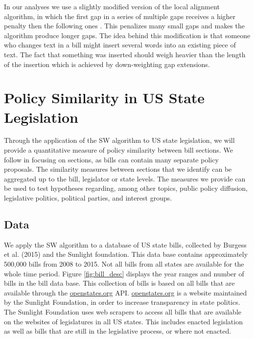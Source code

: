 \documentclass[12pt]{article} %
\begin{document}
In our analyses we use a slightly modified version of the local alignment algorithm, in which the first gap in a series of multiple gaps receives a higher penalty then the following ones \citep[][use the same modification]{wilkerson2015tracing}. This penalizes many small gaps and makes the algorithm produce longer gaps. The idea behind this modification is that someone who changes text in a bill might insert several words into an existing piece of text. The fact that something was inserted should weigh heavier than the length of the insertion which is achieved by down-weighting gap extensions. 




\section{Policy Similarity in US State Legislation}
Through the application of the SW algorithm to US state legislation, we will provide a quantitative measure of policy similarity between bill sections. We follow \citet{wilkerson2015tracing} in focusing on sections, as bills can contain many separate policy proposals. The similarity measures between sections that we identify can be aggregated up to the bill, legislator or state levels. The measures we provide can be used to test hypotheses regarding, among other topics, public policy diffusion, legislative politics, political parties, and interest groups.  

\subsection{Data}
We apply the SW algorithm to a database of US state bills, collected by Burgess et al. (2015) and the Sunlight foundation. This data base contains approximately 500,000 bills from 2008 to 2015. Not all bills from all states are available for the whole time period. Figure \ref{fig:bill_desc} displays the year ranges and number of bills in the bill data base. This collection of bills is based on all bills that are available through the \url{openstates.org} API. \url{openstates.org} is a website maintained by the Sunlight Foundation, in order to increase transparency in state politics. The Sunlight Foundation uses web scrapers to access all bills that are available on the websites of legislatures in all US states. This includes enacted legislation as well as bills that are still in the legislative process, or where not enacted. %
\end{document}
